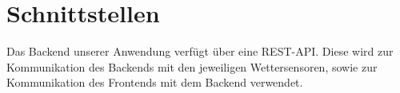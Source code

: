 \section{Schnittstellen}

Das Backend unserer Anwendung verfügt über eine REST-API. Diese wird zur Kommunikation des Backends mit den jeweiligen Wettersensoren, sowie zur Kommunikation des Frontends mit dem Backend verwendet.

